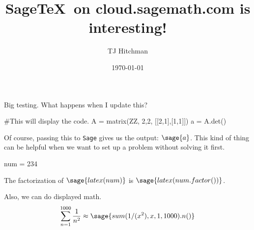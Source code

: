 \documentclass{amsart}
\begin{document}
\title{Sage\TeX\ on cloud.sagemath.com is interesting!}
\author{TJ Hitchman}
\date{\today}

\maketitle



Big testing. What happens when I update this?
\begin{center}
\end{center}


\begin{sageblock}
#This will display the code.
A = matrix(ZZ, 2,2, [[2,1],[1,1]])
a = A.det()
\end{sageblock}


Of course, passing this to \texttt{Sage} gives us the output: $\sage{a}$. This kind of thing can be helpful when we want to set up a problem without solving it first.

\begin{sagesilent}
num = 234
\end{sagesilent}

The factorization of $\sage{latex(num)}$ is $\sage{latex(num.factor())}$.

Also, we can do displayed math.
\[
\sum_{n=1}^{1000} \frac{1}{n^2} \approx \sage{sum( 1/(x^2), x, 1, 1000).n()}
\]
\end{document}
